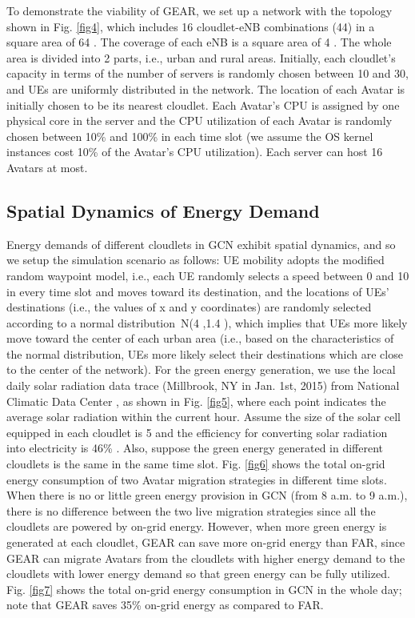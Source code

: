 \documentclass[journal,12pt,draftclsnofoot,onecolumn]{IEEEtran}
\begin{document}
\begin{titlepage}
\begin{center}
To demonstrate the viability of GEAR, we set up a network with the topology shown in Fig. \ref{fig4}, which includes 16 cloudlet-eNB combinations (44) in a square area of 64 . The coverage of each eNB is a square area of 4 . The whole area is divided into 2 parts, i.e., urban and rural areas. Initially, each cloudlet's capacity  in terms of the number of servers is randomly chosen between 10 and 30, and UEs are uniformly distributed in the network. The location of each Avatar is initially chosen to be its nearest cloudlet. Each Avatar's CPU is assigned by one physical core in the server and the CPU utilization of each Avatar is randomly chosen between 10\% and 100\% in each time slot (we assume the OS kernel instances cost 10\% of the Avatar's CPU utilization). Each server can host 16 Avatars at most.\
\subsection{Spatial Dynamics of Energy Demand}
Energy demands of different cloudlets in GCN exhibit spatial dynamics, and so we setup the simulation scenario as follows: UE mobility adopts the modified random waypoint model, i.e., each UE randomly selects a speed between 0 and 10  in every time slot and moves toward its destination, and the locations of UEs' destinations (i.e., the values of x and y coordinates) are randomly selected according to a normal distribution~N(4 ,1.4 ), which implies that UEs more likely move toward the center of each urban area (i.e., based on the characteristics of the normal distribution, UEs more likely select their destinations which are close to the center of the network). For the green energy generation, we use the local daily solar radiation data trace (Millbrook, NY in Jan. 1st, 2015) from National Climatic Data Center \cite{26}, as shown in Fig. \ref{fig5}, where each point indicates the average solar radiation within the current hour. Assume the size of the solar cell equipped in each cloudlet is 5  and the efficiency for converting solar radiation into electricity is 46\% \cite{27}. Also, suppose the green energy generated in different cloudlets is the same in the same time slot. Fig. \ref{fig6} shows the total on-grid energy consumption of two Avatar migration strategies in different time slots. When there is no or little green energy provision in GCN (from 8 a.m. to 9 a.m.), there is no difference between the two live migration strategies since all the cloudlets are powered by on-grid energy. However, when more green energy is generated at each cloudlet, GEAR can save more on-grid energy than FAR, since GEAR can migrate Avatars from the cloudlets with higher energy demand to the cloudlets with lower energy demand so that green energy can be fully utilized. Fig. \ref{fig7} shows the total on-grid energy consumption in GCN in the whole day; note that GEAR saves 35\% on-grid energy as compared to FAR.\


\end{center}
\end{titlepage}
\end{document}
